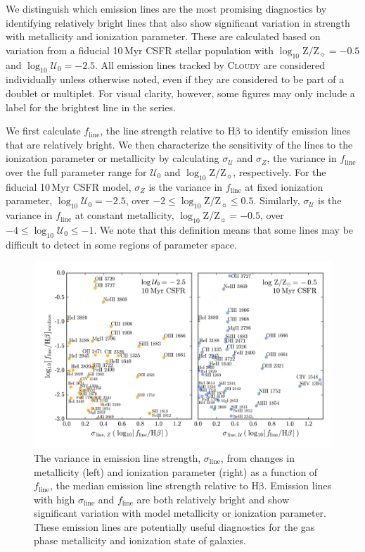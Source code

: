 \documentclass[preprint2,trackchanges]{aastex62}
\newcommand{\Cloudy}{\textsc{Cloudy}\xspace}
\newcommand{\sigmaL}{\ensuremath{\sigma_{\mathrm{line}}}\xspace}
\newcommand{\sigmaU}{\ensuremath{\sigma_{\mathcal{U}}}\xspace}
\newcommand{\sigmaZ}{\ensuremath{\sigma_{Z}}\xspace}
\newcommand{\femline}{\ensuremath{f_{\mathrm{line}}}\xspace}
\newcommand{\hb}{\ensuremath{\mathrm{H\beta}}\xspace}
\newcommand{\Myr}{$\,$Myr\xspace}
\newcommand{\logten}{\ensuremath{\log_{10}}}
\newcommand{\logz}{\ensuremath{\logten \mathrm{Z}/\mathrm{Z}_{\sun}}\xspace}
\newcommand{\logZeq}[1]{\ensuremath{\logten \mathrm{Z}/\mathrm{Z}_{\sun} = #1}}
\newcommand{\U}{\ensuremath{\mathcal{U}_{0}}\xspace}
\newcommand{\logU}{\ensuremath{\logten \mathcal{U}_0}}
\newcommand{\logUeq}[1]{\ensuremath{\logten \mathcal{U}_0 = #1}}
\begin{document}
We distinguish which emission lines are the most promising diagnostics by identifying relatively bright lines that also show significant variation in strength with metallicity and ionization parameter. These are calculated based on variation from a fiducial 10\Myr CSFR stellar population with \logZeq{-0.5} and \logUeq{-2.5}. All emission lines tracked by \Cloudy are considered individually unless otherwise noted, even if they are considered to be part of a doublet or multiplet. For visual clarity, however, some figures may only include a label for the brightest line in the series.

We first calculate \femline, the line strength relative to \hb to identify emission lines that are relatively bright. We then characterize the sensitivity of the lines to the ionization parameter or metallicity by calculating \sigmaU and \sigmaZ, the variance in \femline over the full parameter range for \U and \logz, respectively. For the fiducial 10\Myr CSFR model, \sigmaZ is the variance in \femline at fixed ionization parameter, \logUeq{-2.5}, over $-2 \leq \logz \leq 0.5$. Similarly, \sigmaU is the variance in \femline at constant metallicity, \logZeq{-0.5}, over $-4 \leq \logU \leq -1$. We note that this definition means that some lines may be difficult to detect in some regions of parameter space.

\begin{figure}
  \begin{center}
    \includegraphics[width=\linewidth]{figs/f6.png}
    \caption{The variance in emission line strength, \sigmaL, from changes in metallicity (left) and ionization parameter (right) as a function of \femline, the median emission line strength relative to \hb. Emission lines with high \sigmaL and \femline are both relatively bright and show significant variation with model metallicity or ionization parameter. These emission lines are potentially useful diagnostics for the gas phase metallicity and ionization state of galaxies.}
    \label{fig:sigmaV}
  \end{center}
\end{figure}
\end{document}
